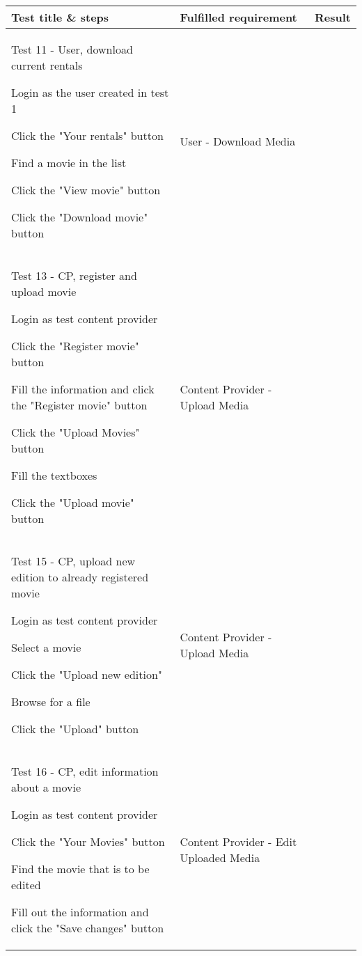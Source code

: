 \begin{centering}
\begin{longtable}{| p{5 cm} | p{7 cm} | c |}
\hline
Test title \& steps & Fulfilled requirement & Result\\
\hline
Test 11 - User, download current rentals
\begin{my_enumerate}
\item Login as the user created in test 1
\item Click the "Your rentals" button
\item Find a movie in the list
\item Click the "View movie" button
\item Click the "Download movie" button\end{my_enumerate}& User - Download Media &  \\

\hline
Test 13 - CP, register and upload movie
\begin{my_enumerate}
\item Login as test content provider
\item Click the "Register movie" button
\item Fill the information and click the "Register movie" button
\item Click the "Upload Movies" button
\item Fill the textboxes
\item Click the "Upload movie" button\end{my_enumerate} & Content Provider - Upload Media &  \\

\hline
Test 15 - CP, upload new edition to already registered movie
\begin{my_enumerate}
\item Login as test content provider
\item Select a movie
\item Click the "Upload new edition"
\item Browse for a file
\item Click the "Upload" button\end{my_enumerate}  & Content Provider - Upload Media &  \\

\hline
Test 16 - CP, edit information about a movie
\begin{my_enumerate}
\item Login as test content provider
\item Click the "Your Movies" button
\item Find the movie that is to be edited
\item Fill out the information and click the "Save changes" button\end{my_enumerate} & Content Provider - Edit Uploaded Media &  \\


\end{longtable}
\end{centering}
